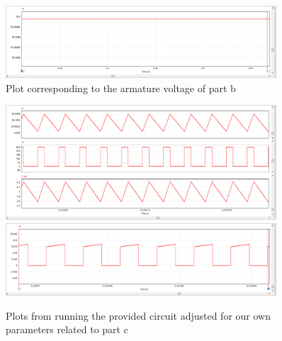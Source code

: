 \documentclass{article}
\begin{document}
\begin{figure}[H]
    \centering
    \includegraphics[width=0.9\textwidth]{q1-d-b.png}
    \caption{Plot corresponding to the armature voltage of part b}
\end{figure}
\begin{figure}[H]
    \centering
    \includegraphics[width=0.9\textwidth]{q1-d.png}
    \includegraphics[width=0.9\textwidth]{q1-d2.png}
    \caption{Plots from running the provided circuit adjusted for our own parameters related to part c}
\end{figure}
\end{document}
